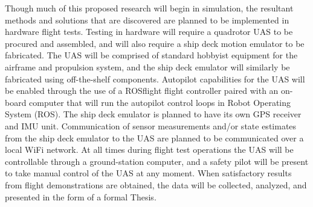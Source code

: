 \documentclass[12pt, letterpaper]{article}
\begin{document}
Though much of this proposed research will begin in simulation, the resultant methods and solutions that are discovered are planned to be implemented in hardware flight tests.  Testing in hardware will require a quadrotor UAS to be procured and assembled, and will also require a ship deck motion emulator to be fabricated.  The UAS will be comprised of standard hobbyist equipment for the airframe and propulsion system, and the ship deck emulator will similarly be fabricated using off-the-shelf components.  Autopilot capabilities for the UAS will be enabled through the use of a ROSflight flight controller paired with an on-board computer that will run the autopilot control loops in Robot Operating System (ROS).  The ship deck emulator is planned to have its own GPS receiver and IMU unit.  Communication of sensor measurements and/or state estimates from the ship deck emulator to the UAS are planned to be communicated over a local WiFi network.  At all times during flight test operations the UAS will be controllable through a ground-station computer, and a safety pilot will be present to take manual control of the UAS at any moment.  When satisfactory results from flight demonstrations are obtained, the data will be collected, analyzed, and presented in the form of a formal Thesis. 




\end{document}
